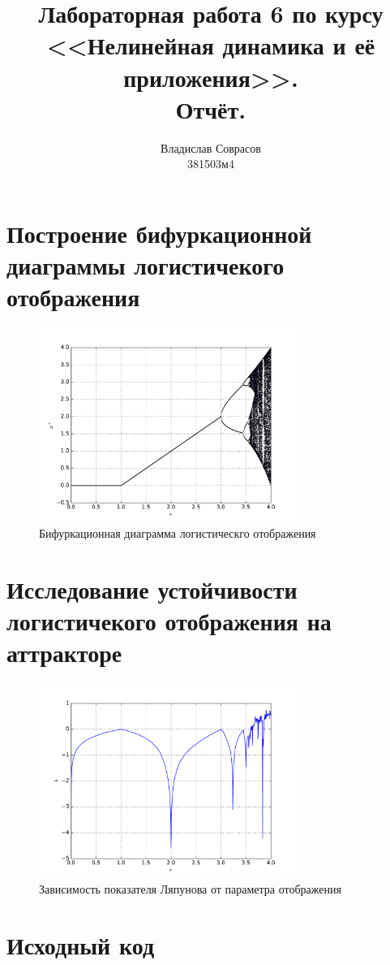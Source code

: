\documentclass[a4paper]{article}
\begin{document}
\title{Лабораторная работа 6 по курсу <<Нелинейная динамика и её приложения>>. \\Отчёт.}
\author{Владислав Соврасов\\ 381503м4}
\date{}
\maketitle

\section{Построение бифуркационной диаграммы логистичекого отображения}

\begin{figure}[H]
	\center
	\includegraphics[width=0.75\textwidth]{../pictures/lab6_bifurcation_diagram.pdf}
	\caption{Бифуркационная диаграмма логистическго отображения}
	\label{fig:bifurcation_diagram}
\end{figure}

\section{Исследование устойчивости логистичекого отображения на аттракторе}

\begin{figure}[H]
	\center
	\includegraphics[width=0.75\textwidth]{../pictures/lab6_lyapunov_characteristic.pdf}
	\caption{Зависимость показателя Ляпунова от параметра отображения}
	\label{fig:lyapunov_characteristic}
\end{figure}

\section{Исходный код}

\end{document}
